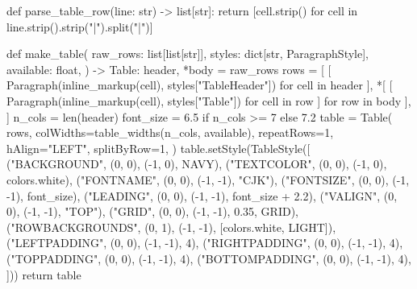 \documentclass[UTF8,a4paper,fontset=fandol]{ctexart}
\begin{document}
\begin{ProjectCode}
def parse_table_row(line: str) -> list[str]:
    return [cell.strip() for cell in line.strip().strip("|").split("|")]


def make_table(
    raw_rows: list[list[str]],
    styles: dict[str, ParagraphStyle],
    available: float,
) -> Table:
    header, *body = raw_rows
    rows = [
        [
            Paragraph(inline_markup(cell), styles["TableHeader"])
            for cell in header
        ],
        *[
            [
                Paragraph(inline_markup(cell), styles["Table"])
                for cell in row
            ]
            for row in body
        ],
    ]
    n_cols = len(header)
    font_size = 6.5 if n_cols >= 7 else 7.2
    table = Table(
        rows,
        colWidths=table_widths(n_cols, available),
        repeatRows=1,
        hAlign="LEFT",
        splitByRow=1,
    )
    table.setStyle(TableStyle([
        ("BACKGROUND", (0, 0), (-1, 0), NAVY),
        ("TEXTCOLOR", (0, 0), (-1, 0), colors.white),
        ("FONTNAME", (0, 0), (-1, -1), "CJK"),
        ("FONTSIZE", (0, 0), (-1, -1), font_size),
        ("LEADING", (0, 0), (-1, -1), font_size + 2.2),
        ("VALIGN", (0, 0), (-1, -1), "TOP"),
        ("GRID", (0, 0), (-1, -1), 0.35, GRID),
        ("ROWBACKGROUNDS", (0, 1), (-1, -1), [colors.white, LIGHT]),
        ("LEFTPADDING", (0, 0), (-1, -1), 4),
        ("RIGHTPADDING", (0, 0), (-1, -1), 4),
        ("TOPPADDING", (0, 0), (-1, -1), 4),
        ("BOTTOMPADDING", (0, 0), (-1, -1), 4),
    ]))
    return table



\end{ProjectCode}
\end{document}
